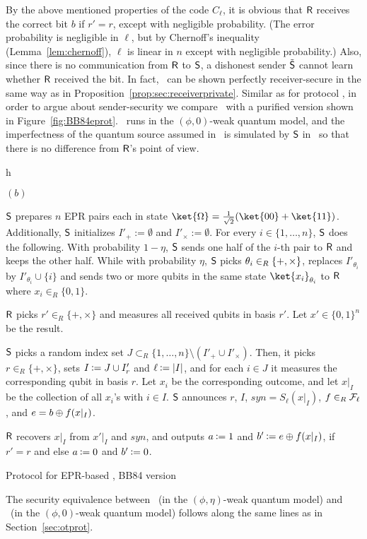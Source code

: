 By the above mentioned properties of the code $C_{\ell}$, it is
obvious that ${\sf R}$ receives the correct bit $b$ if $r'=r$, except with
negligible probability.  (The
error probability is negligible in $\ell$, but by Chernoff's
 inequality (Lemma~\ref{lem:chernoff}),
$\ell$ is linear in $n$ except with negligible probability.)  Also,
since there is no communication from ${\sf R}$ to ${\sf S}$, a dishonest sender
$\tilde{\sf S}$ cannot learn whether ${\sf R}$ received the bit. In fact, \BBqot\ can
 
be shown perfectly receiver-secure in the same way as in
Proposition~\ref{prop:sec:receiverprivate}.  Similar as for protocol
\qot, in order to argue about sender-security we compare \BBqot\ with
a purified version shown in Figure~\ref{fig:BB84eprot}.  \BBeprqot\ 
runs in the $(\phi,0)$-weak quantum model, and the imperfectness of
the quantum source assumed in \BBqot\ is simulated by ${\sf S}$ in
\BBeprqot\ so that there is no difference from ${\sf R}$'s point of view.
\index{weak quantum model}

\begin{myfigure}{h}
\begin{myprotocol}{\BBeprqot$(b)$}
\item ${\sf S}$ prepares $n$ EPR pairs each in state
  $\ket{\Omega}=\frac{1}{\sqrt{2}}(\ket{00}+\ket{11})$. Additionally,
  ${\sf S}$ initializes $I'_{+}:= \emptyset$ and $I'_{\times}:= \emptyset$.
  For every $i \in \{1,\ldots,n\}$, ${\sf S}$ does the following. With
  probability $1-\eta$, ${\sf S}$ sends one half of the $i$-th pair to ${\sf R}$
  and keeps the other half. While with probability $\eta$, ${\sf S}$ picks
  $\theta_i \in_R \{+,\times\}$, replaces $I'_{\theta_i}$ by
  $I'_{\theta_i} \cup \{i\}$ and sends two or more qubits in the same
  state $\ket{x_i}_{\theta_i}$ to ${\sf R}$ where $x_i \in_R \{0,1\}$.
\item ${\sf R}$ picks $r'\in_R\{+,\times \}$ and measures all received
  qubits in basis $r'$. Let $x'\in\{0,1\}^n$ be the result.
\item\label{it:abort} ${\sf S}$ picks a random index set $J \subset_R
  \{1,\ldots,n\} \setminus (I'_{+}\cup I'_{\times})$. Then, it picks $r \in_R \{+,\times \}$, sets $I \assign J \cup I'_r$ and $\ell \assign |I|$, and for each $i \in J$ it measures the corresponding qubit
  in basis $r$. Let $x_i$ be the corresponding outcome, and let
  $x|_{I}$ be the collection of all $x_i$'s with $i \in
  I$. ${\sf S}$ announces $r$, $I$, $syn =
  S_{\ell}(x|_{I})$, $f\in_R \mathcal{F}_{\ell}$, and $e = b\oplus
  f(x|_{I})$.
\item ${\sf R}$ recovers $x|_{I}$ from $x'|_{I}$ and
  $syn$, and outputs $a \assign 1$ and $b' \assign e \oplus \hf(x|_{I})$, if
  $r'=r$ and else $a \assign 0$ and $b' \assign 0$.
\end{myprotocol}
\caption{Protocol for EPR-based \RabinOT, BB84 version}\label{fig:BB84eprot}
\end{myfigure}
The security equivalence between \BBqot\ (in the $(\phi,\eta)$-weak
quantum model) and \BBeprqot\ (in the $(\phi,0)$-weak quantum model)
follows along the same lines as in Section~\ref{sec:otprot}. 


